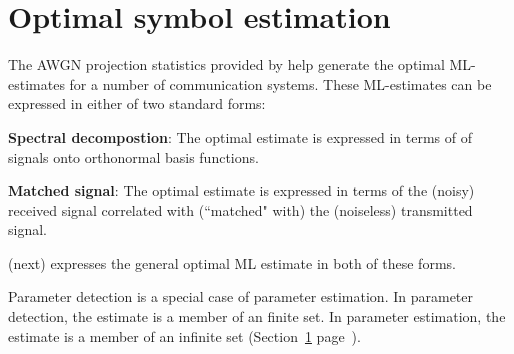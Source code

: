 {\section{Optimal symbol estimation}
\label{sec:awgn_est}
The AWGN projection statistics provided by
 help generate the optimal
ML-estimates for a number of communication systems.
These ML-estimates can be expressed in either of two standard forms:
\begin{liste}
  \item {\bf Spectral decompostion}:
     The optimal estimate is expressed in terms of 
     of signals onto orthonormal basis functions.
  \item {\bf Matched signal}:
     The optimal estimate is expressed in terms of the (noisy)
     received signal correlated with (``matched" with)
     the (noiseless) transmitted signal.
\end{liste}
 (next) expresses the general
optimal ML estimate in both of these forms.

Parameter detection is a special case of parameter estimation.
In parameter detection, the estimate is a member of an finite set.
In parameter estimation, the estimate is a member of an infinite set
(Section~\ref{sec:awgn_est} page~\pageref{sec:awgn_est}).


}
